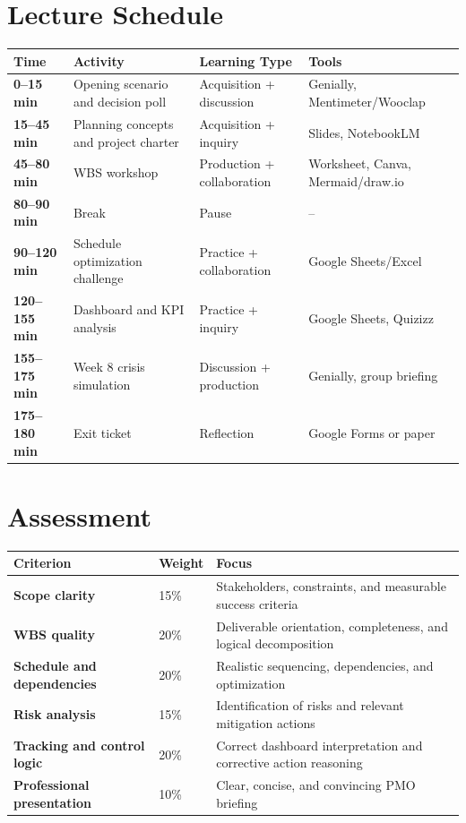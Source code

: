 \documentclass[11pt,a4paper]{article}
\begin{document}
\section*{Lecture Schedule}

\begin{longtable}{>{\bfseries}p{2.5cm}p{5.1cm}p{4cm}p{3cm}}
\textbf{Time} & \textbf{Activity} & \textbf{Learning Type} & \textbf{Tools} \\
\hline
0--15 min & Opening scenario and decision poll & Acquisition + discussion & Genially, Mentimeter/Wooclap \\
15--45 min & Planning concepts and project charter & Acquisition + inquiry & Slides, NotebookLM \\
45--80 min & WBS workshop & Production + collaboration & Worksheet, Canva, Mermaid/draw.io \\
80--90 min & Break & Pause & -- \\
90--120 min & Schedule optimization challenge & Practice + collaboration & Google Sheets/Excel \\
120--155 min & Dashboard and KPI analysis & Practice + inquiry & Google Sheets, Quizizz \\
155--175 min & Week 8 crisis simulation & Discussion + production & Genially, group briefing \\
175--180 min & Exit ticket & Reflection & Google Forms or paper \\
\end{longtable}

\section*{Assessment}

\begin{longtable}{>{\bfseries}p{6cm}p{3cm}p{5.3cm}}
\textbf{Criterion} & \textbf{Weight} & \textbf{Focus} \\
\hline
Scope clarity & 15\% & Stakeholders, constraints, and measurable success criteria \\
WBS quality & 20\% & Deliverable orientation, completeness, and logical decomposition \\
Schedule and dependencies & 20\% & Realistic sequencing, dependencies, and optimization \\
Risk analysis & 15\% & Identification of risks and relevant mitigation actions \\
Tracking and control logic & 20\% & Correct dashboard interpretation and corrective action reasoning \\
Professional presentation & 10\% & Clear, concise, and convincing PMO briefing \\
\end{longtable}
\end{document}
